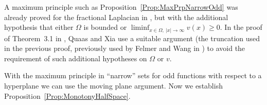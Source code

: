 \begin{remark}
	A maximum principle such as Proposition~\ref{Prop:MaxPrpNarrowOdd} was already proved for the fractional Laplacian in \cite{ChenLiLi}, but with the additional hypothesis that either $\Omega$ is bounded or $\liminf_{x\in  \Omega,\ |x|\to \infty} v(x) \geq 0$. In the proof of Theorem~3.1 in \cite{QuaasXia}, Quaas and Xia use a suitable argument (the truncation used in the previous proof, previously used by Felmer and Wang in \cite{FelmerWang}) to avoid the requirement of such additional hypotheses on $\Omega$ or $v$.
\end{remark}

With the maximum principle in ``narrow'' sets for odd functions with respect to a hyperplane we can use the moving plane argument. Now we establish Proposition~\ref{Prop:MonotonyHalfSpace}.


